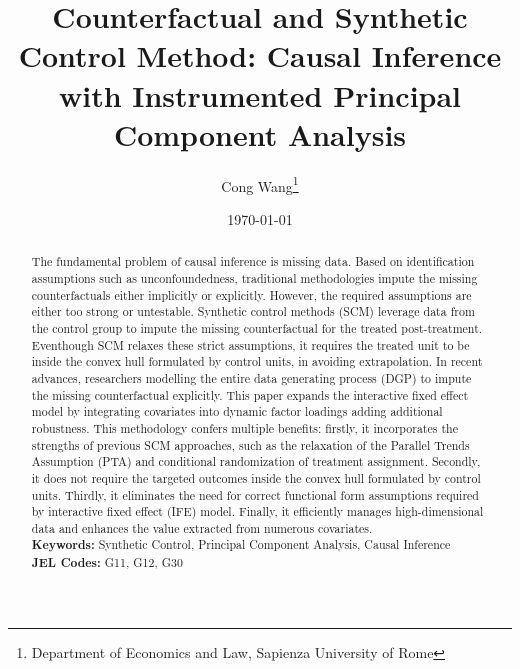 \documentclass[12pt]{article}
\begin{document}
\newtheorem{assumption}{Assumption}

\begin{titlepage}
\title{Counterfactual and Synthetic Control Method: Causal Inference with Instrumented Principal Component Analysis}
\author{ Cong Wang\thanks{Department of Economics and Law, Sapienza University of Rome}}
\date{\today}
\maketitle
\begin{abstract}
\noindent The fundamental problem of causal inference is missing data. Based on identification assumptions such as unconfoundedness, traditional methodologies impute the missing counterfactuals either implicitly or explicitly. However, the required assumptions are either too strong or untestable. Synthetic control methods (SCM) leverage data from the control group to impute the missing counterfactual for the treated post-treatment. Eventhough SCM relaxes these strict assumptions, it requires the treated unit to be inside the convex hull formulated by control units, in avoiding extrapolation. In recent advances, researchers modelling the entire data generating process (DGP) to impute the missing counterfactual explicitly. This paper expands the interactive fixed effect model by integrating covariates into dynamic factor loadings adding additional robustness. This methodology confers multiple benefits: firstly, it incorporates the strengths of previous SCM approaches, such as the relaxation of the Parallel Trends Assumption (PTA) and conditional randomization of treatment assignment. Secondly, it does not require the targeted outcomes inside the convex hull formulated by control units. Thirdly, it eliminates the need for correct functional form assumptions required by interactive fixed effect (IFE) model. Finally, it efficiently manages high-dimensional data and enhances the value extracted from numerous covariates.\\

\noindent\textbf{Keywords:} Synthetic Control, Principal Component Analysis, Causal Inference\\

\noindent\textbf{JEL Codes:} G11, G12, G30\\
\bigskip
\end{abstract}
\setcounter{page}{0}
\thispagestyle{empty}
\end{titlepage}
\pagebreak \newpage
\end{document}
